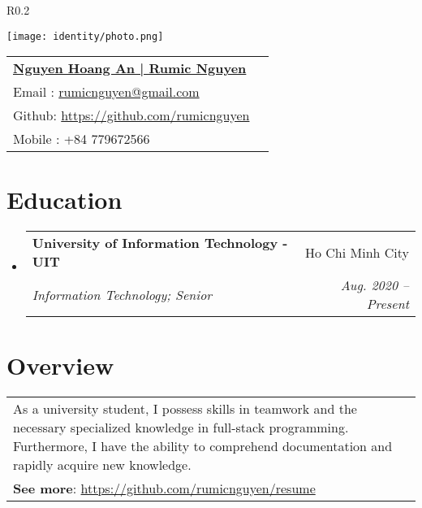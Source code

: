 \documentclass[letterpaper,11pt]{article}
\makeatletter
\newcommand{\resumeSubheading}[4]{
  \vspace{-1pt}\item
    \begin{tabular*}{0.97\textwidth}{l@{\extracolsep{\fill}}r}
      \textbf{#1} & #2 \\
      \textit{\small#3} & \textit{\small #4} \\
    \end{tabular*}\vspace{-5pt}
}
\newcommand{\resumeSubHeadingListStart}{\begin{itemize}[leftmargin=*]}
\newcommand{\resumeSubHeadingListEnd}{\end{itemize}}
\makeatother
\begin{document}


\begin{wrapfigure}{R}{0.2\textwidth}
  \vspace{-2.2cm}
  \begin{center}
    \texttt{[image: identity/photo.png]}
  \end{center}
\end{wrapfigure}


\begin{tabular*}{\textwidth}{l@{\extracolsep{\fill}}r}
  \textbf{\href{http://sourabhbajaj.com/}{\Large Nguyen Hoang An | Rumic Nguyen}} \\
  \vspace{1.5mm}
  Email : \href{mailto:rumicnguyen@gmail.com}{rumicnguyen@gmail.com} \\
  \vspace{1.5mm}
  Github: \href{https://github.com/rumicnguyen}{https://github.com/rumicnguyen}\\
  \vspace{1.5mm}
  Mobile : +84 779672566
\end{tabular*}


\section{Education}
\resumeSubHeadingListStart
\resumeSubheading
{University of Information Technology - UIT}{Ho Chi Minh City}
{Information Technology; Senior }{Aug. 2020 -- Present}
\resumeSubHeadingListEnd


\section{Overview}
\vspace{2mm}
\begin{tabular}{p{\textwidth} r}
  As a university student, I possess skills in teamwork and the necessary specialized knowledge in full-stack programming.
  Furthermore, I have the ability to comprehend documentation and rapidly acquire new knowledge.
  \vspace{2mm}
  \\ \textbf{See more}: \href{https://github.com/rumicnguyen/resume}{https://github.com/rumicnguyen/resume}
\end{tabular}
\end{document}
